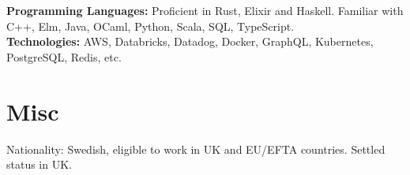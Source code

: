\documentclass[margin,line]{res}
\begin{document}
\begin{resume}
     {\bf Programming Languages:} Proficient in Rust, Elixir and Haskell. Familiar
    with C++, Elm, Java, OCaml, Python, Scala, SQL, TypeScript.\\
    {\bf Technologies:} AWS, Databricks, Datadog, Docker, GraphQL, Kubernetes, PostgreSQL, Redis,
    etc.

    \section{\sc Misc}

    Nationality: Swedish, eligible to work in UK and EU/EFTA countries. Settled status in UK.

\end{resume}
\end{document}
